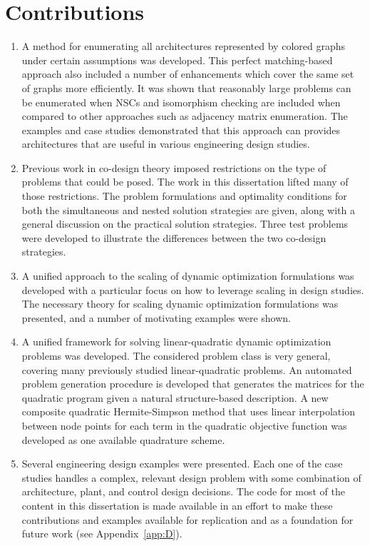 \section{Contributions}

\begin{enumerate}
\item A method for enumerating all architectures represented by colored graphs under certain assumptions was developed.
This perfect matching-based approach also included a number of enhancements which cover the same set of graphs more efficiently.
It was shown that reasonably large problems can be enumerated when NSCs and isomorphism checking are included when compared to other approaches such as adjacency matrix enumeration.
The examples and case studies demonstrated that this approach can provides architectures that are useful in various engineering design studies.

\item Previous work in co-design theory imposed restrictions on the type of problems that could be posed.
The work in this dissertation lifted many of those restrictions. 
The problem formulations and optimality conditions for both the simultaneous and nested solution strategies are given, along with a general discussion on the practical solution strategies.
Three test problems were developed to illustrate the differences between the two co-design strategies. 

\item A unified approach to the scaling of dynamic optimization formulations was developed with a particular focus on how to leverage scaling in design studies. 
The necessary theory for scaling dynamic optimization formulations was presented, and a number of motivating examples were shown.

\item A unified framework for solving linear-quadratic dynamic
optimization problems was developed. 
The considered problem class is very general, covering many previously studied linear-quadratic problems. 
An automated problem generation procedure is developed that generates the matrices for the quadratic program given a natural structure-based description.
A new composite quadratic Hermite-Simpson method that uses linear interpolation between node points for each term in the quadratic objective function was developed as one available quadrature scheme.

\item Several engineering design examples were presented.
Each one of the case studies handles a complex, relevant design problem with some combination of architecture, plant, and control design decisions.
The code for most of the content in this dissertation is made available in an effort to make these contributions and examples available for replication and as a foundation for future work (see Appendix~\ref{app:D}).

\end{enumerate}

